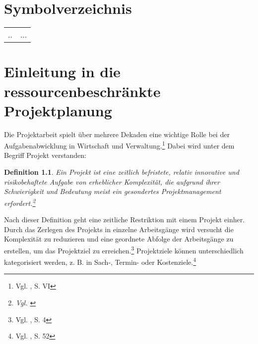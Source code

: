 \documentclass[a4paper,12pt,normalheadings,footexclude,headinclude,liststotoc,nochapterprefix,onecolumn,oneside,parskip,pointlessnumbers]{scrreprt}
\newtheorem{mydef}{Definition}
\begin{document}
\chapter*{Symbolverzeichnis}
\begin{table}[h!]
    \vspace*{-3mm}
    \hspace*{2mm}
  \renewcommand{\arraystretch}{1,5}
    \begin{tabular}{ll}  %
.. & ...\\
	\end{tabular}
\end{table}






\begingroup
\renewcommand*{\addvspace}[1]{}
\listoftables
\endgroup


\begingroup
\renewcommand*{\addvspace}[1]{}
\listoffigures
\endgroup


\newpage
{}   %


\chapter{Einleitung in die ressourcenbeschränkte Projektplanung}
Die Projektarbeit spielt über mehrere Dekaden eine wichtige Rolle bei der Aufgabenabwicklung in Wirtschaft und Verwaltung.\footnote{Vgl. \cite{zimmermann2006projektplanung}, S. VI} Dabei wird unter dem Begriff Projekt verstanden:
\begingroup
\renewcommand*{\addvspace}[1]{}
\begin{mydef}
\glqq Ein Projekt ist eine zeitlich befristete, relativ innovative und risikobehaftete Aufgabe von erheblicher Komplexität, die aufgrund ihrer Schwierigkeit und Bedeutung meist ein gesondertes Projektmanagement erfordert.\grqq\footnote{Vgl. \cite{projektdef}}
\end{mydef}
\endgroup
Nach dieser Definition geht eine zeitliche Restriktion mit einem Projekt einher. Durch das Zerlegen des Projekts in einzelne Arbeitsgänge wird versucht die Komplexität zu reduzieren und eine geordnete Abfolge der Arbeitsgänge zu erstellen, um das Projektziel zu erreichen.\footnote{Vgl. \cite{zimmermann2006projektplanung}, S. 4} Projektziele können unterschiedlich kategorisiert werden, z. B. in Sach-, Termin- oder Kostenziele.\footnote{Vgl. \cite{felkai2011analysieren}, S. 52}
\end{document}
